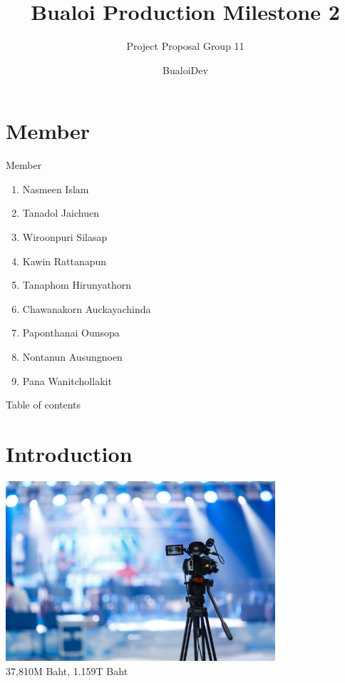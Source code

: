 \documentclass[aspectratio=169]{beamer}
\title{
	Bualoi Production Milestone 2
}
\subtitle{
    Project Proposal Group 11
}
\author{
   BualoiDev 
}
\date{
}
\begin{document}
\frame{\titlepage}

\section{Member}
\begin{frame}{Member}
    \begin{enumerate}
        \item Nasmeen Islam
        \item Tanadol Jaichuen
        \item Wiroonpuri Silasap
        \item Kawin Rattanapun
        \item Tanaphom Hirunyathorn
        \item Chawanakorn Auckayachinda
        \item Paponthanai Ounsopa
        \item Nontanun Ausungnoen
        \item Pana Wanitchollakit
    \end{enumerate}
\end{frame}

\begin{frame}{Table of contents}
\end{frame}

\section{Introduction}

\begin{frame}
    \centering
    \includegraphics[width=0.75\textwidth]{intro.png} \\
    37,810M Baht, 1.159T Baht

\end{frame}
\end{document}
